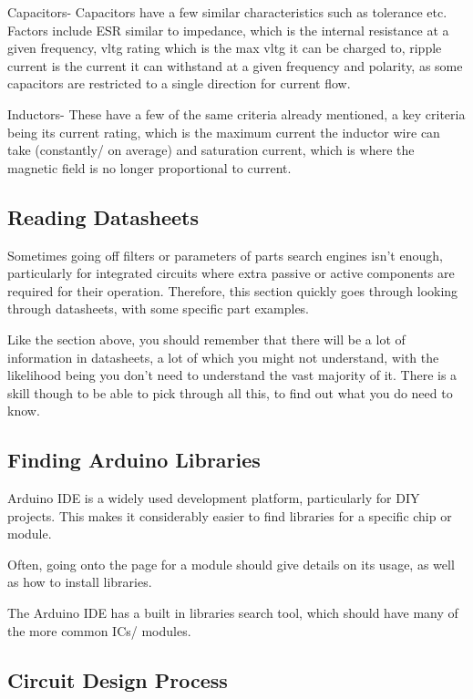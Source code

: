 \documentclass[a4paper,11pt]{report}
\begin{document}
Capacitors- Capacitors have a few similar characteristics such as tolerance etc. Factors include ESR similar to impedance, which is the internal resistance at a given frequency, \gls{vltg} rating which is the max \gls{vltg} it can be charged to, ripple current is the current it can withstand at a given frequency and polarity, as some capacitors are restricted to a single direction for current flow.

Inductors- These have a few of the same criteria already mentioned, a key criteria being its current rating, which is the maximum current the inductor wire can take (constantly/ on average) and saturation current, which is where the magnetic field is no longer proportional to current.

\subsection{Reading Datasheets}

Sometimes going off filters or parameters of parts search engines isn't enough, particularly for integrated circuits where extra passive or active components are required for their operation. Therefore, this section quickly goes through looking through datasheets, with some specific part examples.

Like the section above, you should remember that there will be a lot of information in datasheets, a lot of which you might not understand, with the likelihood being you don't need to understand the vast majority of it. There is a skill though to be able to pick through all this, to find out what you do need to know.

\subsection{Finding Arduino Libraries}

Arduino IDE is a widely used development platform, particularly for DIY projects. This makes it considerably easier to find libraries for a specific chip or module.

Often, going onto the page for a module should give details on its usage, as well as how to install libraries.

The Arduino IDE has a built in libraries search tool, which should have many of the more common ICs/ modules.

\subsection{Circuit Design Process}
\end{document}

